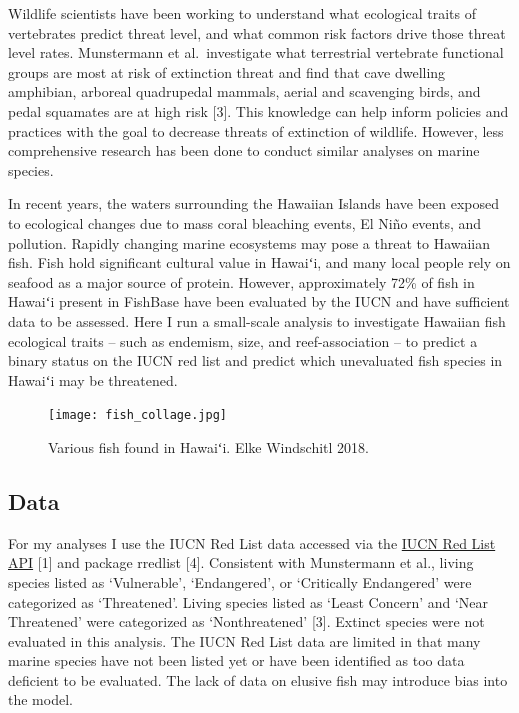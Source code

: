 \documentclass[
  letterpaper,
  DIV=11,
  numbers=noendperiod]{scrartcl}
\begin{document}
Wildlife scientists have been working to understand what ecological
traits of vertebrates predict threat level, and what common risk factors
drive those threat level rates. Munstermann et al.~investigate what
terrestrial vertebrate functional groups are most at risk of extinction
threat and find that cave dwelling amphibian, arboreal quadrupedal
mammals, aerial and scavenging birds, and pedal squamates are at high
risk {[}3{]}. This knowledge can help inform policies and practices with
the goal to decrease threats of extinction of wildlife. However, less
comprehensive research has been done to conduct similar analyses on
marine species.

In recent years, the waters surrounding the Hawaiian Islands have been
exposed to ecological changes due to mass coral bleaching events, El
Niño events, and pollution. Rapidly changing marine ecosystems may pose
a threat to Hawaiian fish. Fish hold significant cultural value in
Hawaiʻi, and many local people rely on seafood as a major source of
protein. However, approximately 72\% of fish in Hawaiʻi present in
FishBase have been evaluated by the IUCN and have sufficient data to be
assessed. Here I run a small-scale analysis to investigate Hawaiian fish
ecological traits -- such as endemism, size, and reef-association -- to
predict a binary status on the IUCN red list and predict which
unevaluated fish species in Hawaiʻi may be threatened.

\begin{figure}

{\centering \texttt{[image: fish\_collage.jpg]}

}

\caption{Various fish found in Hawaiʻi. Elke Windschitl 2018.}

\end{figure}

\hypertarget{data}{%
\subsection{Data}\label{data}}

For my analyses I use the IUCN Red List data accessed via the
\href{https://apiv3.iucnredlist.org/}{IUCN Red List API} {[}1{]} and
package rredlist {[}4{]}. Consistent with Munstermann et al., living
species listed as `Vulnerable', `Endangered', or `Critically Endangered'
were categorized as `Threatened'. Living species listed as `Least
Concern' and `Near Threatened' were categorized as `Nonthreatened'
{[}3{]}. Extinct species were not evaluated in this analysis. The IUCN
Red List data are limited in that many marine species have not been
listed yet or have been identified as too data deficient to be
evaluated. The lack of data on elusive fish may introduce bias into the
model.
\end{document}
